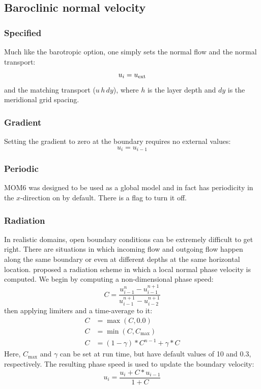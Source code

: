 \documentclass[11pt]{article}
\begin{document}
\subsection{Baroclinic normal velocity}
\label{sec_bc_normal}
\subsubsection{Specified}
Much like the barotropic option, one simply sets the normal flow
and the normal transport:
\begin{equation}
  u_{i} = u_{\rm ext}
\end{equation}
and the matching transport ($u \, h \, dy$),
where $h$ is the layer depth and $dy$ is the meridional grid
spacing.

\subsubsection{Gradient}
Setting the gradient to zero at the boundary requires no external values:
\begin{equation}
  u_{i} = u_{i-1}
\end{equation}

\subsubsection{Periodic}
MOM6 was designed to be used as a global model and in fact has
periodicity in the $x$-direction on by default. There is a flag to
turn it off.

\subsubsection{Radiation}
\label{S_rad}
In realistic domains, open boundary conditions can be extremely
difficult to get right. There are situations in which incoming flow and
outgoing flow happen along the same boundary or even at different
depths at the same horizontal location. \citet{Orlanski76}
proposed a radiation scheme in which a local normal phase velocity is
computed. We begin by computing a non-dimensional phase speed:
\begin{equation}
  C = \frac{u^n_{i-1} - u^{n+1}_{i-1}}{u^{n+1}_{i-1} - u^{n+1}_{i-2}}
\end{equation}
then applying limiters and a time-average to it:
\begin{align}
  C &= \max(C, 0.0) \\
  C &= \min(C, C_{\max}) \\
  C &= (1 - \gamma) * C^{n-1} + \gamma * C
\end{align}
Here, $C_{\max}$ and $\gamma$ can be set at run time, but have default
values of 10 and 0.3, respectively. The resulting phase speed is
used to update the boundary velocity:
\begin{equation}
   u_{i} = \frac{u_{i} + C * u_{i-1}}{1 + C}
\label{eqorl}
\end{equation}
\end{document}
